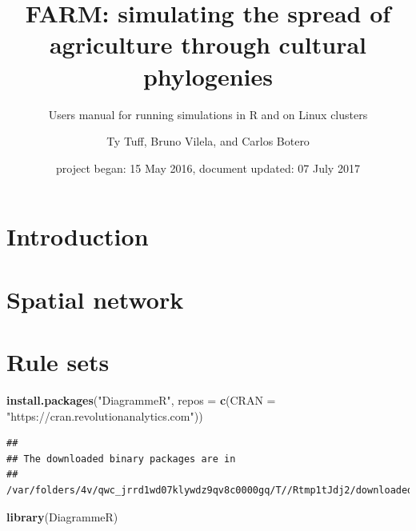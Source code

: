 \documentclass[]{book}
\title{FARM: simulating the spread of agriculture through cultural phylogenies}
\subtitle{Users manual for running simulations in R and on Linux clusters}
\author{Ty Tuff, Bruno Vilela, and Carlos Botero}
\date{project began: 15 May 2016, document updated: 07 July 2017}
\newenvironment{Shaded}{\begin{snugshade}}{\end{snugshade}}
\newcommand{\KeywordTok}[1]{\textcolor[rgb]{0.13,0.29,0.53}{\textbf{{#1}}}}
\newcommand{\DataTypeTok}[1]{\textcolor[rgb]{0.13,0.29,0.53}{{#1}}}
\newcommand{\StringTok}[1]{\textcolor[rgb]{0.31,0.60,0.02}{{#1}}}
\newcommand{\NormalTok}[1]{{#1}}
\theoremstyle{definition}
\theoremstyle{definition}
\theoremstyle{remark}
\begin{document}
\maketitle

{
\setcounter{tocdepth}{1}
\tableofcontents
}
\chapter{Introduction}\label{introduction}

\chapter{Spatial network}\label{spatial-network}

\chapter{Rule sets}\label{rule-sets}

\begin{Shaded}
\begin{Highlighting}[]
\KeywordTok{install.packages}\NormalTok{(}\StringTok{"DiagrammeR"}\NormalTok{, }\DataTypeTok{repos =} \KeywordTok{c}\NormalTok{(}\DataTypeTok{CRAN =} \StringTok{"https://cran.revolutionanalytics.com"}\NormalTok{))}
\end{Highlighting}
\end{Shaded}

\begin{verbatim}
## 
## The downloaded binary packages are in
##  /var/folders/4v/qwc_jrrd1wd07klywdz9qv8c0000gq/T//Rtmp1tJdj2/downloaded_packages
\end{verbatim}

\begin{Shaded}
\begin{Highlighting}[]
\KeywordTok{library}\NormalTok{(DiagrammeR)}
\end{Highlighting}
\end{Shaded}
\end{document}
